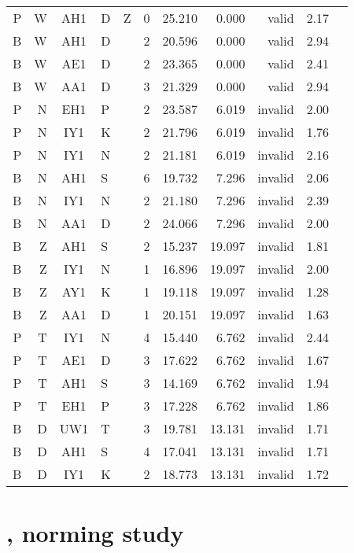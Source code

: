 \begin{longtable}{r@{ }r@{ }c@{ }ll rrrrrr}
 P & W & AH1 & D &  Z &  0 & 25.210 &  0.000 &   valid & 2.17 \\
 B & W & AH1 & D &    &  2 & 20.596 &  0.000 &   valid & 2.94 \\
 B & W & AE1 & D &    &  2 & 23.365 &  0.000 &   valid & 2.41 \\
 B & W & AA1 & D &    &  3 & 21.329 &  0.000 &   valid & 2.94 \\
 P & N & EH1 & P &    &  2 & 23.587 &  6.019 & invalid & 2.00 \\
 P & N & IY1 & K &    &  2 & 21.796 &  6.019 & invalid & 1.76 \\
 P & N & IY1 & N &    &  2 & 21.181 &  6.019 & invalid & 2.16 \\
 B & N & AH1 & S &    &  6 & 19.732 &  7.296 & invalid & 2.06 \\
 B & N & IY1 & N &    &  2 & 21.180 &  7.296 & invalid & 2.39 \\
 B & N & AA1 & D &    &  2 & 24.066 &  7.296 & invalid & 2.00 \\
 B & Z & AH1 & S &    &  2 & 15.237 & 19.097 & invalid & 1.81 \\
 B & Z & IY1 & N &    &  1 & 16.896 & 19.097 & invalid & 2.00 \\
 B & Z & AY1 & K &    &  1 & 19.118 & 19.097 & invalid & 1.28 \\
 B & Z & AA1 & D &    &  1 & 20.151 & 19.097 & invalid & 1.63 \\
 P & T & IY1 & N &    &  4 & 15.440 &  6.762 & invalid & 2.44 \\
 P & T & AE1 & D &    &  3 & 17.622 &  6.762 & invalid & 1.67 \\
 P & T & AH1 & S &    &  3 & 14.169 &  6.762 & invalid & 1.94 \\
 P & T & EH1 & P &    &  3 & 17.228 &  6.762 & invalid & 1.86 \\
 B & D & UW1 & T &    &  3 & 19.781 & 13.131 & invalid & 1.71 \\
 B & D & AH1 & S &    &  4 & 17.041 & 13.131 & invalid & 1.71 \\
 B & D & IY1 & K &    &  2 & 18.773 & 13.131 & invalid & 1.72 \\
\bottomrule
\end{longtable}

\section{\citet{Albright2003b}, norming study} 

